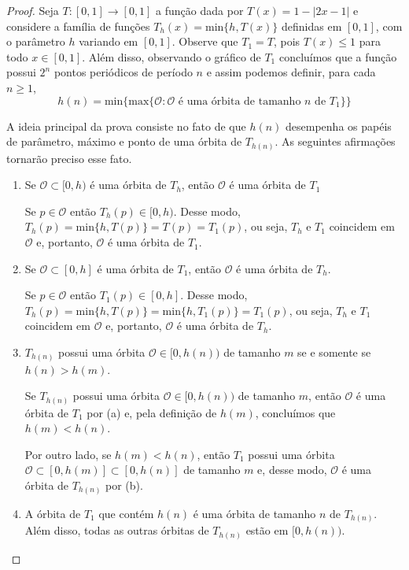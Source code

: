 \begin{proof}
Seja $T: [0,1] \to [0,1]$ a função dada por $T(x) = 1 - |2x - 1|$ e considere a família de funções $T_h(x) = \textrm{min}\{h, T(x)\}$ definidas em $[0,1]$, com o parâmetro $h$ variando em $[0,1]$. Observe que $T_1 = T$, pois $T(x) \leq 1$ para todo $x \in [0,1]$. Além disso, observando o gráfico de $T_1$ concluímos que a função possui $2^n$ pontos periódicos de período $n$ e assim podemos definir, para cada $n \geq 1$, $$h(n) = \textrm{min} \{ \textrm{max} \{ \mathcal{O} : \mathcal{O} \textrm{ é uma órbita de tamanho } n \textrm{ de } T_1\} \}$$

A ideia principal da prova consiste no fato de que $h(n)$ desempenha os papéis de parâmetro, máximo e ponto de uma órbita de $T_{h(n)}$. As seguintes afirmações tornarão preciso esse fato.

\begin{enumerate}[label = (\alph*)]
\item Se $\mathcal{O} \subset [0, h)$ é uma órbita de $T_h$, então $\mathcal{O}$ é uma órbita de $T_1$

Se $p \in \mathcal{O}$ então $T_h(p) \in [0, h)$. Desse modo, $T_h(p) = \textrm{min}\{h, T(p)\} = T(p) = T_1(p)$, ou seja, $T_h$ e $T_1$ coincidem em $\mathcal{O}$ e, portanto, $\mathcal{O}$ é uma órbita de $T_1$.

\item Se $\mathcal{O} \subset [0, h]$ é uma órbita de $T_1$, então $\mathcal{O}$ é uma órbita de $T_h$.

Se $p \in \mathcal{O}$ então $T_1(p) \in [0, h]$. Desse modo, $T_h(p) = \textrm{min}\{h, T(p)\} = \textrm{min}\{h, T_1(p)\} = T_1(p)$, ou seja, $T_h$ e $T_1$ coincidem em $\mathcal{O}$ e, portanto, $\mathcal{O}$ é uma órbita de $T_h$.

\item $T_{h(n)}$ possui uma órbita $\mathcal{O} \in [0, h(n))$ de tamanho $m$ se e somente se $h(n) > h(m)$.

Se $T_{h(n)}$ possui uma órbita $\mathcal{O} \in [0, h(n))$ de tamanho $m$, então $\mathcal{O}$ é uma órbita de $T_1$ por (a) e, pela definição de $h(m)$, concluímos que $h(m) < h(n)$.

Por outro lado, se $h(m) < h(n)$, então $T_1$ possui uma órbita $\mathcal{O} \subset [0, h(m)] \subset [0, h(n)]$ de tamanho $m$ e, desse modo, $\mathcal{O}$ é uma órbita de $T_{h(n)}$ por (b).

\item A órbita de $T_1$ que contém $h(n)$ é uma órbita de tamanho $n$ de $T_{h(n)}$. Além disso, todas as outras órbitas de $T_{h(n)}$ estão em $[0, h(n))$. 


\end{enumerate}
\end{proof}
